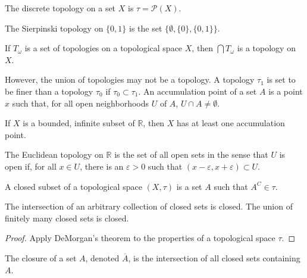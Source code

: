 \documentclass[crop=false,class=article,oneside]{standalone}
\begin{document}
        \begin{example}
            The discrete topology on a set $X$ is
            $\tau=\mathcal{P}(X)$.
        \end{example}
        \begin{example}
            The Sierpinski topology
            on $\{0,1\}$ is the set
            $\{\emptyset,\{0\},\{0,1\}\}$.
        \end{example}
        \begin{theorem}
            If $T_{\omega}$ is a set of topologies on
            a topological space $X$, then
            $\bigcap{T_{\omega}}$ is a topology on $X$.
        \end{theorem}
        However, the union of topologies may not be a
        topology. A topology $\tau_{1}$ is set to
        be finer than a topology $\tau_{0}$ if
        $\tau_{0}\subset\tau_{1}$. An accumulation point
        of a set $A$ is a point $x$ such that, for
        all open neighborhoods $U$ of $A$,
        $U\cap{A}\ne\emptyset$.
        \begin{theorem}
            If $X$ is a bounded, infinite subset of
            $\mathbb{R}$, then $X$ has at least
            one accumulation point.
        \end{theorem}
        \begin{definition}
            The Euclidean topology on
            $\mathbb{R}$ is the set of
            all open sets in the sense that
            $U$ is open if, for all $x\in{U}$,
            there is an $\varepsilon>0$ such
            that $(x-\varepsilon,x+\varepsilon)\subset{U}$.
        \end{definition}
        \begin{definition}
            A closed subset of a topological space
            $(X,\tau)$ is a set $A$ such that
            $A^{C}\in\tau$.
        \end{definition}
        \begin{theorem}
            The intersection of an arbitrary collection of
            closed sets is closed. The union of finitely
            many closed sets is closed.
        \end{theorem}
        \begin{proof}
            Apply DeMorgan's theorem to the properties
            of a topological space $\tau$.
        \end{proof}
        \begin{definition}
            The closure of a set $A$,
            denoted $\overline{A}$, is the
            intersection of all closed sets
            containing $A$.
        \end{definition}
\end{document}
